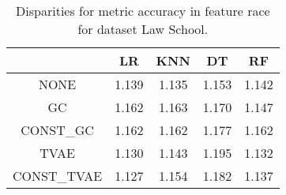 \begin{table}
\caption{Disparities for metric accuracy in feature race for dataset Law School.}
\label{tab:disp-LAW SCHOOL-race-accuracy}
\begin{tabular}{ccccc}
\toprule
 & LR & KNN & DT & RF \\
\midrule
NONE & 1.139 & 1.135 & 1.153 & 1.142 \\
GC & 1.162 & 1.163 & 1.170 & 1.147 \\
CONST\_GC & 1.162 & 1.162 & 1.177 & 1.162 \\
TVAE & 1.130 & 1.143 & 1.195 & 1.132 \\
CONST\_TVAE & 1.127 & 1.154 & 1.182 & 1.137 \\
\bottomrule
\end{tabular}
\end{table}
